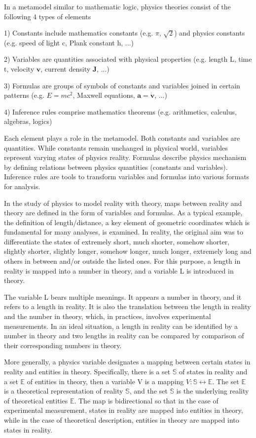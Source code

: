 \documentclass{amsart}
\theoremstyle{definition}
\theoremstyle{remark}
\numberwithin{equation}{section}
\begin{document}
In a metamodel similar to mathematic logic\cite{Zaring,Sheppard}, physics theories consist of the following 4 types of elements

1) Constants include mathematics constants (e.g. $\pi$, $\sqrt{2}$) and physics constants (e.g. speed of light c, Plank constant h, ...)

2) Variables are quantities associated with physical properties (e.g. length L, time t, velocity $\mathbf v$, current density $\mathbf J$, ...)

3) Formulas are groups of symbols of constants and variables joined in certain patterns (e.g. $E=mc^2$, Maxwell equations, $\mathbf a=\dot{\mathbf v}$, ...)

4) Inference rules comprise mathematics theorems (e.g. arithmetics, calculus, algebras, logics)

Each element plays a role in the metamodel. Both constants and variables are quantities. While constants remain unchanged in physical world, variables represent varying states of physics reality. Formulas describe physics mechanism by defining relations between physics quantities (constants and variables). Inference rules are tools to transform variables and formulas into various formats for analysis.

In the study of physics to model reality with theory, maps between reality and theory are defined in the form of variables and formulas. As a typical example, the definition of length/distance, a key element of geometric coordinates which is fundamental for many analyses, is examined. In reality, the original aim was to differentiate the states of extremely short, much shorter, somehow shorter, slightly shorter, slightly longer, somehow longer, much longer, extremely long and others in between and/or outside the listed ones. For this purpose, a length in reality is mapped into a number in theory, and a variable L is introduced in theory.

The variable L bears multiple meanings. It appears a number in theory, and it refers to a length in reality. It is also the translation between the length in reality and the number in theory, which, in practices,  involves experimental measurements. In an ideal situation, a length in reality can be identified by a number in theory and two lengths in reality can be compared by comparison of their corresponding numbers in theory.

More generally, a physics variable designates a mapping between certain states in reality and entities in theory. Specifically, there is a set $\mathbb{S}$ of states in reality and a set $\mathbb{E}$ of entities in theory, then a variable V is a mapping $V: \mathbb{S}\leftrightarrow \mathbb{E}$. The set $\mathbb{E}$ is a theoretical representation of reality $\mathbb{S}$, and the set $\mathbb{S}$ is the underlying reality of theoretical entities $\mathbb{E}$. The map is bidirectional so that in the case of experimental measurement, states in reality are mapped into entities in theory, while in the case of theoretical description, entities in theory are mapped into states in reality.
\end{document}
